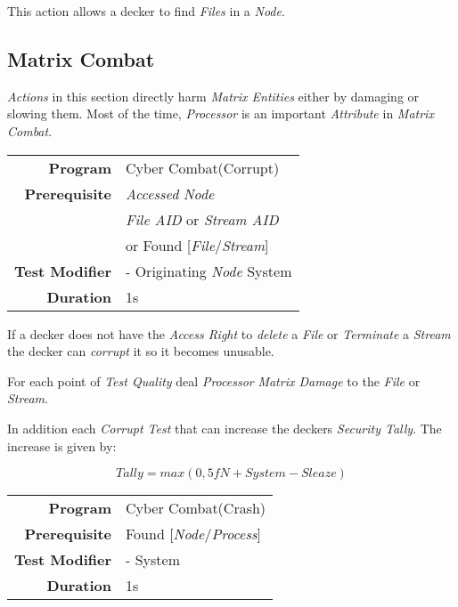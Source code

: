 \hfill

This action allows a decker to find \emph{Files} in a \emph{Node}.

\subsection{Matrix Combat}
\label{subsec:matrix combat}

\emph{Actions} in this section directly harm \emph{Matrix Entities} either by
damaging or slowing them. Most of the time, \emph{Processor} is an important
\emph{Attribute} in \emph{Matrix Combat}.

\label{par:corrupt action}

\begin{tabular}{rl}
    \textbf{Program}       & Cyber Combat(Corrupt)                \\
    \textbf{Prerequisite}  & \emph{Accessed} \emph{Node}          \\
                           & \emph{File AID} or \emph{Stream AID} \\
                           & or Found [\emph{File}/\emph{Stream}] \\
    \textbf{Test Modifier} & - Originating \emph{Node} System     \\
    \textbf{Duration}      & 1s                                   \\
\end{tabular}

\hfill

If a decker does not have the \emph{Access Right} to \emph{delete} a \emph{File}
or \emph{Terminate} a \emph{Stream} the decker can \emph{corrupt} it so it becomes
unusable.

For each point of \emph{Test Quality} deal \emph{Processor} \emph{Matrix Damage}
to the \emph{File} or \emph{Stream}.

In addition each \emph{Corrupt Test} that can increase the deckers
\emph{Security Tally}.
The increase is given by:

\begin{equation*}
    \textit{Tally} = max(0, \textit{5fN} + \textit{System} - \textit{Sleaze})
\end{equation*}

\label{par:crash}

\begin{tabular}{rl}
    \textbf{Program}       & Cyber Combat(Crash)                \\
    \textbf{Prerequisite}  & Found [\emph{Node}/\emph{Process}] \\
    \textbf{Test Modifier} & - System                           \\
    \textbf{Duration}      & 1s                                 \\
\end{tabular}

